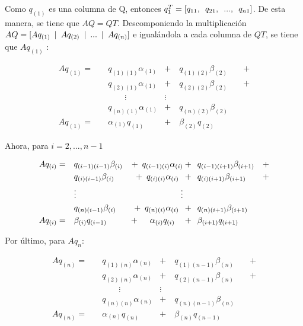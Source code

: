 Como $q_{(1)}$ es una columna de Q, entonces $q_1^T = [q_{11},\enskip q_{21},\enskip ... ,\enskip q_{n1}]$. De esta manera, se tiene que $AQ = QT$. Descomponiendo la multiplicación $AQ =[Aq_{(1)} \enskip|\enskip Aq_{(2)} \enskip|\enskip ... \enskip|\enskip Aq_{(n)}]$ e igualándola a cada columna de $QT$, se tiene que $Aq_{(1)}$ \cite{golub2012matrix}:

\begin{equation*}
\begin{aligned}
Aq_{(1)} =\quad &  q_{(1)(1)} \alpha_{(1)}       &+\quad q_{(1)(2)} \beta_{(2)} \quad&+ \\
     & q_{(2)(1)}   \alpha_{(1)}       &+\quad q_{(2)(2)} \beta_{(2)} \quad&+ \\
     &          \qquad         \vdots&\vdots \qquad     & \\
     & q_{(n)(1)}   \alpha_{(1)}       &+\quad q_{(n)(2)} \beta_{(2)} \quad& \\
Aq_{(1)} =\quad & \alpha_{(1)} q_{(1)} &+\quad \beta_{(2)} q_{(2)}   \qquad& 
\end{aligned}
\end{equation*}

Ahora, para $i = 2, ..., n-1$
  
\begin{equation*}
\begin{aligned}
Aq_{(i)} =\quad &  q_{(i-1)(i-1)}\beta_{(i)}  &+ \enskip q_{(i-1)(i)}\alpha_{(i)} &+ \enskip q_{(i-1)(i+1)} \beta_{(i+1)} &+ \\
     & q_{(i)(i-1)}\beta_{(i)}       &+ \enskip q_{(i)(i)}\alpha_{(i)}\enskip   &+\enskip q_{(i)(i+1)} \beta_{(i+1)}   &+ \\
     & \vdots &          \qquad \qquad \quad \vdots & &\\
     & q_{(n)(i-1)}\beta_{(i)}      &+\enskip q_{(n)(i)}\alpha_{(i)} \enskip  &+\enskip q_{(n)(i+1)} \beta_{(i+1)}   & \\
Aq_{(i)} =\quad & \beta_{(i)} q_{(i-1)}      &+ \enskip\quad \alpha_{(i)} q_{(i)} \quad    &+\enskip \beta_{(i+1)} q_{(i+1)}      &
\end{aligned}
\end{equation*}

Por último, para $Aq_n$:

\begin{equation*}
\begin{aligned}
Aq_{(n)} =\quad &  q_{(1)(n)} \alpha_{(n)}       &+\quad q_{(1)(n-1)} \beta_{(n)} \quad&+ \\
     & q_{(2)(n)}   \alpha_{(n)}       &+\quad q_{(2)(n-1)} \beta_{(n)} \quad&+ \\
     &          \qquad         \vdots&\vdots \qquad     & \\
     & q_{(n)(n)}   \alpha_{(n)}       &+\quad q_{(n)(n-1)} \beta_{(n)} \quad& \\
Aq_{(n)} =\quad & \alpha_{(n)} q_{(n)} &+\quad \beta_{(n)} q_{(n-1)}   \qquad& 
\end{aligned}
\end{equation*}


